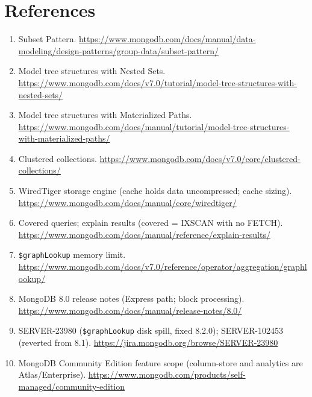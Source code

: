 \documentclass[11pt]{article}
\newcommand{\code}[1]{\texttt{#1}}
\begin{document}
\section*{References}
\small
\begin{enumerate}\itemsep2pt
\item Subset Pattern. \url{https://www.mongodb.com/docs/manual/data-modeling/design-patterns/group-data/subset-pattern/}
\item Model tree structures with Nested Sets. \url{https://www.mongodb.com/docs/v7.0/tutorial/model-tree-structures-with-nested-sets/}
\item Model tree structures with Materialized Paths. \url{https://www.mongodb.com/docs/manual/tutorial/model-tree-structures-with-materialized-paths/}
\item Clustered collections. \url{https://www.mongodb.com/docs/v7.0/core/clustered-collections/}
\item WiredTiger storage engine (cache holds data uncompressed; cache sizing). \url{https://www.mongodb.com/docs/manual/core/wiredtiger/}
\item Covered queries; explain results (covered = IXSCAN with no FETCH). \url{https://www.mongodb.com/docs/manual/reference/explain-results/}
\item \code{\$graphLookup} memory limit. \url{https://www.mongodb.com/docs/v7.0/reference/operator/aggregation/graphlookup/}
\item MongoDB 8.0 release notes (Express path; block processing). \url{https://www.mongodb.com/docs/manual/release-notes/8.0/}
\item SERVER-23980 (\code{\$graphLookup} disk spill, fixed 8.2.0); SERVER-102453 (reverted from 8.1). \url{https://jira.mongodb.org/browse/SERVER-23980}
\item MongoDB Community Edition feature scope (column-store and analytics are Atlas/Enterprise). \url{https://www.mongodb.com/products/self-managed/community-edition}
\end{enumerate}
\end{document}
